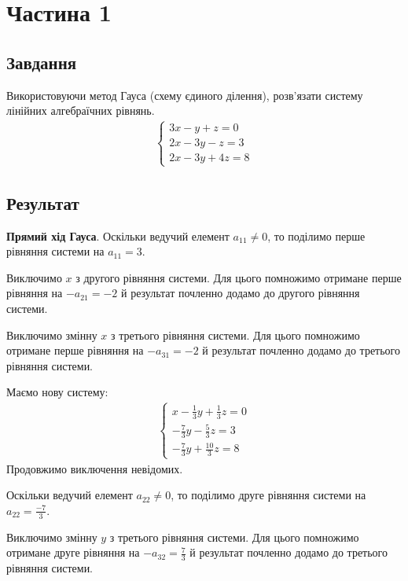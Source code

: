 \section{Частина 1}
\label{sec:task1}

\subsection{Завдання}
\label{subsec:task1_task}

Використовуючи метод Гауса (схему єдиного ділення),
розв'язати систему лінійних алгебраїчних рівнянь.
\begin{align*}
    \begin{cases}
        3x - y + z = 0  \\
        2x - 3y - z = 3 \\
        2x - 3y + 4z = 8
    \end{cases}
\end{align*}

\subsection{Результат}
\label{subsec:task1_result}

\textbf{Прямий хід Гауса}.
Оскільки ведучий елемент $a_{11} \neq 0$, то
поділимо перше рівняння системи на $a_{11} = 3$.

Виключимо $x$ з другого рівняння системи.
Для цього помножимо отримане перше рівняння на $-a_{21} = -2$
й результат почленно додамо до другого рівняння системи.

Виключимо змінну $x$ з третього рівняння системи.
Для цього помножимо отримане перше рівняння на $-a_{31} = -2$
й результат почленно додамо до третього рівняння системи.

Маємо нову систему:
\begin{align*}
    \begin{cases}
        x - \frac{1}{3}y + \frac{1}{3}z = 0 \\
        - \frac{7}{3}y - \frac{5}{3}z = 3   \\
        - \frac{7}{3}y + \frac{10}{3}z = 8
    \end{cases}
\end{align*}
Продовжимо виключення невідомих.

Оскільки ведучий елемент $a_{22} \neq 0$, то
поділимо друге рівняння системи на $a_{22} = \frac{-7}{3}$.

Виключимо змінну $y$ з третього рівняння системи.
Для цього помножимо отримане друге рівняння на $-a_{32} = \frac{7}{3}$
й результат почленно додамо до третього рівняння системи.

